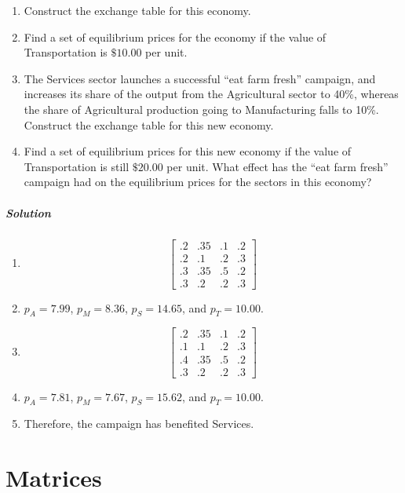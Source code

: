 \documentclass[oneside]{book}
\begin{document}
\begin{enumerate}
\item Construct the exchange table for this economy.
\item Find a set of equilibrium prices for the economy if the value of
  Transportation is \(\$10.00\) per unit.
\item {The Services sector launches a successful ``eat farm fresh'' campaign,
       and increases its share of the output from the Agricultural sector to
40\%,
       whereas the share of Agricultural production going to Manufacturing falls
to 10\%.
       Construct the exchange table for this new economy.}
\item {Find a set of equilibrium prices for this new economy if the value of
    Transportation is still \(\$20.00\) per unit.
       What effect has the ``eat farm fresh'' campaign had on the equilibrium
prices for the sectors in this economy?}
\end{enumerate}

\subparagraph{Solution}

\begin{enumerate}
  \item {
  \[ \begin{bmatrix}
.2 & .35 & .1 & .2 \\
.2 &  .1 & .2 & .3 \\
.3 & .35 & .5 & .2 \\
.3 &  .2 & .2 & .3
      \end{bmatrix} \]}
  \item{\(p_A = 7.99\), \(p_M = 8.36\), \(p_S = 14.65\), and \(p_T = 10.00\).}
  \item {\[ \begin{bmatrix}
.2 & .35 & .1 & .2 \\
.1 &  .1 & .2 & .3 \\
.4 & .35 & .5 & .2 \\
.3 &  .2 & .2 & .3
            \end{bmatrix} \]}
  \item{\(p_A = 7.81\), \(p_M = 7.67\), \(p_S = 15.62\), and \(p_T = 10.00\).}
  \item{Therefore, the campaign has benefited Services.}
\end{enumerate}

\section{Matrices}
\end{document}
